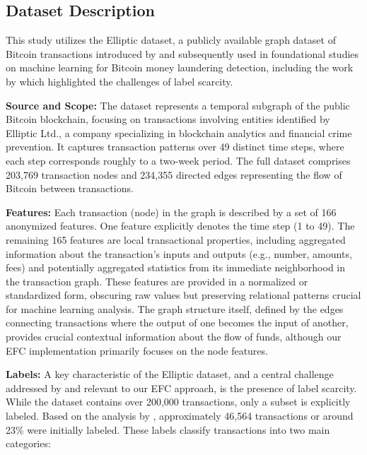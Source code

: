 \documentclass[12pt]{article}
\begin{document}
\subsection{Dataset Description} \label{subsec:dataset}

This study utilizes the Elliptic dataset, a publicly available graph dataset of Bitcoin transactions introduced by 
\cite{weber2019antimoneylaunderingbitcoinexperimenting} and subsequently used in foundational studies on machine
learning for Bitcoin money laundering detection, including the work by \cite{lorenz2021machinelearningmethodsdetect}
which highlighted the challenges of label scarcity.

\textbf{Source and Scope:} The dataset represents a temporal subgraph of the public Bitcoin blockchain, focusing on transactions
involving entities identified by Elliptic Ltd., a company specializing in blockchain analytics and financial crime prevention.
It captures transaction patterns over 49 distinct time steps, where each step corresponds roughly to a two-week period.
The full dataset comprises 203,769 transaction nodes and 234,355 directed edges representing the flow of Bitcoin between
transactions.

\textbf{Features:} Each transaction (node) in the graph is described by a set of 166 anonymized features. One feature
explicitly denotes the time step (1 to 49). The remaining 165 features are local transactional properties, including
aggregated information about the transaction's inputs and outputs (e.g., number, amounts, fees) and potentially aggregated
statistics from its immediate neighborhood in the transaction graph. These features are provided in a normalized or
standardized form, obscuring raw values but preserving relational patterns crucial for machine learning analysis. The
graph structure itself, defined by the edges connecting transactions where the output of one becomes the input of another,
provides crucial contextual information about the flow of funds, although our EFC implementation primarily focuses on the
node features.

\textbf{Labels:} A key characteristic of the Elliptic dataset, and a central challenge addressed by 
\cite{lorenz2021machinelearningmethodsdetect} and relevant to our EFC approach, is the presence of label scarcity. While
the dataset contains over 200,000 transactions, only a subset is explicitly labeled. Based on the analysis by 
\cite{weber2019antimoneylaunderingbitcoinexperimenting}, approximately 46,564 transactions or around 23\% were initially labeled.
These labels classify transactions into two main categories:
\end{document}
